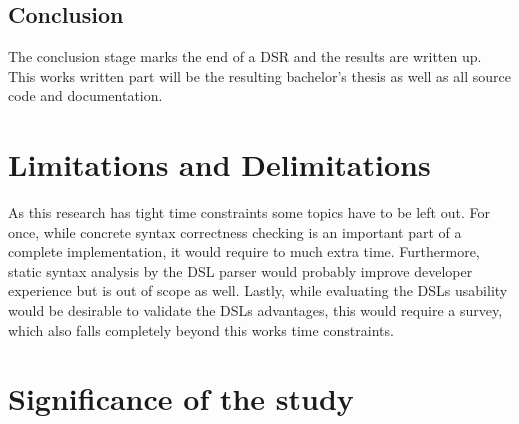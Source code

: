 \documentclass[10pt,a4paper,oneside]{scrartcl}
\newcommand\hint[2]{
\ifthenelse{\boolean{showhints}}{
\begin{center}
\colorbox{black!10}{
\begin{minipage}{.963\textwidth}
#2\hfill\textbf{#1}
\end{minipage}
}\end{center}}{}
}
\begin{document}
\subsection{Conclusion}
The conclusion stage marks the end of a DSR and the results are written up. This works written part will be the resulting bachelor's thesis as well as all source code and documentation.



\section{Limitations and Delimitations}


As this research has tight time constraints some topics have to be left out. For once, while concrete syntax correctness checking is an important part of a complete implementation, it would require to much extra time. Furthermore, static syntax analysis by the DSL parser would probably improve developer experience but is out of scope as well. Lastly, while evaluating the DSLs usability would be desirable to validate the DSLs advantages, this would require a survey, which also falls completely beyond this works time constraints.

\section{Significance of the study}
\end{document}

